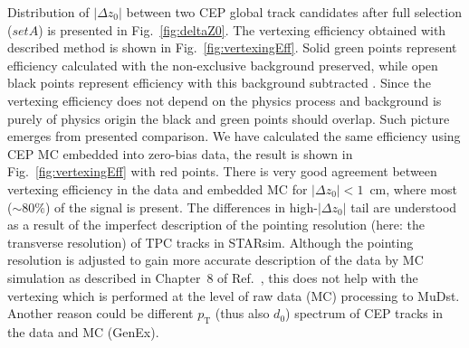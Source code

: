 Distribution of $|\Delta z_{0}|$ between two CEP global track candidates after full selection ($set A$) is presented in Fig.~\ref{fig:deltaZ0}. The vertexing efficiency obtained with described method is shown in Fig.~\ref{fig:vertexingEff}. Solid green points represent efficiency calculated with the non-exclusive background preserved, while open black points represent efficiency with this background subtracted%
. Since the vertexing efficiency does not depend on the physics process and background is purely of physics origin the black and green points should overlap. Such picture emerges from presented comparison. We have calculated the same efficiency using CEP MC embedded into zero-bias data, the result is shown in Fig.~\ref{fig:vertexingEff} with red points. There is very good agreement between vertexing efficiency in the data and embedded MC for $|\Delta z_{0}|<1$~cm, where most ($\sim80\%$) of the signal is present. The differences in high-$|\Delta z_{0}|$ tail are understood as a result of the imperfect description of the pointing resolution (here: the transverse resolution) of TPC tracks in STARsim. Although the pointing resolution is adjusted to gain more accurate description of the data by MC simulation as described in Chapter~8 of Ref.~\cite{supplementaryNote}, this does not help with the vertexing which is performed at the level of raw data (MC) processing to MuDst. Another reason could be different $p_{\text{T}}$ (thus also $d_{0}$) spectrum of CEP tracks in the data and MC (GenEx).

